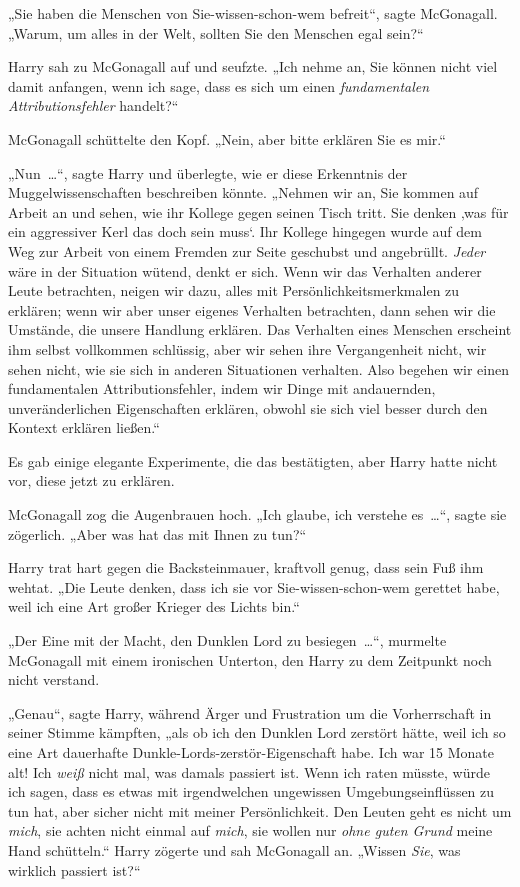 „Sie haben die Menschen von Sie-wissen-schon-wem befreit“, sagte McGonagall. „Warum, um alles in der Welt, sollten Sie den Menschen egal sein?“

Harry sah zu McGonagall auf und seufzte. „Ich nehme an, Sie können nicht viel damit anfangen, wenn ich sage, dass es sich um einen \emph{fundamentalen Attributionsfehler} handelt?“

McGonagall schüttelte den Kopf. „Nein, aber bitte erklären Sie es mir.“

„Nun …“, sagte Harry und überlegte, wie er diese Erkenntnis der Muggelwissenschaften beschreiben könnte. „Nehmen wir an, Sie kommen auf Arbeit an und sehen, wie ihr Kollege gegen seinen Tisch tritt. Sie denken ‚was für ein aggressiver Kerl das doch sein muss‘. Ihr Kollege hingegen wurde auf dem Weg zur Arbeit von einem Fremden zur Seite geschubst und angebrüllt. \emph{Jeder} wäre in der Situation wütend, denkt er sich. Wenn wir das Verhalten anderer Leute betrachten, neigen wir dazu, alles mit Persönlichkeitsmerkmalen zu erklären; wenn wir aber unser eigenes Verhalten betrachten, dann sehen wir die Umstände, die unsere Handlung erklären. Das Verhalten eines Menschen erscheint ihm selbst vollkommen schlüssig, aber wir sehen ihre Vergangenheit nicht, wir sehen nicht, wie sie sich in anderen Situationen verhalten. Also begehen wir einen fundamentalen Attributionsfehler, indem wir Dinge mit andauernden, unveränderlichen Eigenschaften erklären, obwohl sie sich viel besser durch den Kontext erklären ließen.“

Es gab einige elegante Experimente, die das bestätigten, aber Harry hatte nicht vor, diese jetzt zu erklären.

McGonagall zog die Augenbrauen hoch. „Ich glaube, ich verstehe es …“, sagte sie zögerlich. „Aber was hat das mit Ihnen zu tun?“

Harry trat hart gegen die Backsteinmauer, kraftvoll genug, dass sein Fuß ihm wehtat. „Die Leute denken, dass ich sie vor Sie-wissen-schon-wem gerettet habe, weil ich eine Art großer Krieger des Lichts bin.“

„Der Eine mit der Macht, den Dunklen Lord zu besiegen …“, murmelte McGonagall mit einem ironischen Unterton, den Harry zu dem Zeitpunkt noch nicht verstand.

„Genau“, sagte Harry, während Ärger und Frustration um die Vorherrschaft in seiner Stimme kämpften, „als ob ich den Dunklen Lord zerstört hätte, weil ich so eine Art dauerhafte Dunkle-Lords-zerstör-Eigenschaft habe. Ich war 15 Monate alt! Ich \emph{weiß} nicht mal, was damals passiert ist. Wenn ich raten müsste, würde ich sagen, dass es etwas mit irgendwelchen ungewissen Umgebungseinflüssen zu tun hat, aber sicher nicht mit meiner Persönlichkeit. Den Leuten geht es nicht um \emph{mich}, sie achten nicht einmal auf \emph{mich}, sie wollen nur \emph{ohne guten Grund} meine Hand schütteln.“ Harry zögerte und sah McGonagall an. „Wissen \emph{Sie}, was wirklich passiert ist?“

